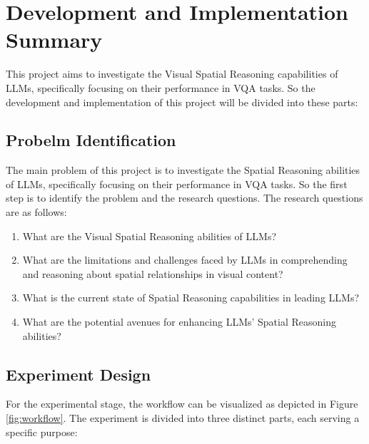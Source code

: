 \documentclass[journal,10pt]{IEEEtran}
\begin{document}
\section{Development and Implementation Summary}
This project aims to investigate the Visual Spatial Reasoning capabilities of LLMs, specifically focusing on their performance in VQA tasks. So the development and implementation of this project will be divided into these parts:

\subsection{Probelm Identification}
The main problem of this project is to investigate the Spatial Reasoning abilities of LLMs, specifically focusing on their performance in VQA tasks. So the first step is to identify the problem and the research questions. The research questions are as follows:
\begin{enumerate}
    \item What are the Visual Spatial Reasoning abilities of LLMs?
    \item What are the limitations and challenges faced by LLMs in comprehending and reasoning about spatial relationships in visual content?
    \item What is the current state of Spatial Reasoning capabilities in leading LLMs?
    \item What are the potential avenues for enhancing LLMs' Spatial Reasoning abilities?
\end{enumerate}

\subsection{Experiment Design}
For the experimental stage, the workflow can be visualized as depicted in Figure \ref{fig:workflow}. The experiment is divided into three distinct parts, each serving a specific purpose:
\end{document}
